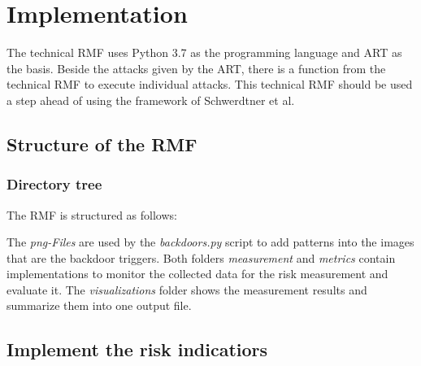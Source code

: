 \section{Implementation}
\label{sec:implementation}

The technical RMF uses Python 3.7 as the programming language and ART as the basis. Beside the attacks given by the ART, there is a function from the technical RMF to execute individual attacks. This technical RMF should be used a step ahead of using the framework of Schwerdtner et al.

\subsection{Structure of the RMF}

\subsubsection*{Directory tree}

The RMF is structured as follows: \\


\break \noindent The \textit{png-Files} are used by the \textit{backdoors.py} script to add patterns into the images that are the backdoor triggers. Both folders \textit{measurement} and \textit{metrics} contain implementations to monitor the collected data for the risk measurement and evaluate it. The \textit{visualizations} folder shows the measurement results and summarize them into one output file.

\subsection{Implement the risk indicatiors}

